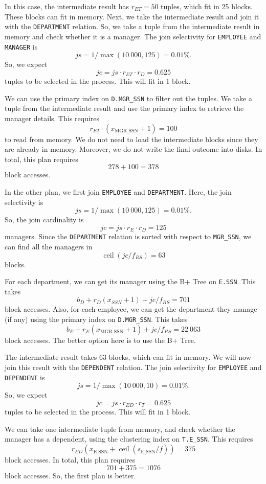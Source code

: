 \documentclass[a4paper, openany]{memoir}
\theoremstyle{definition}
\theoremstyle{plain}
\begin{document}
In this case, the intermediate result has $r_{ET} = 50$ tuples, which fit in 25 blocks. These blocks can fit in memory. Next, we take the intermediate result and join it with the \texttt{DEPARTMENT} relation. So, we take a tuple from the intermediate result in memory and check whether it is a manager. The join selectivity for \texttt{EMPLOYEE} and \texttt{MANAGER} is
\[\textit{js} = 1/\max(10\ 000, 125) = 0.01\%.\]
So, we expect
\[\textit{jc} = \textit{js} \cdot r_{ET} \cdot r_D = 0.625\]
tuples to be selected in the process. This will fit in 1 block. 

We can use the primary index on \texttt{D.MGR\_SSN} to filter out the tuples. We take a tuple from the intermediate result and use the primary index to retrieve the manager details. This requires
\[r_{ET} \cdot (x_{\text{MGR\_SSN}} + 1) = 100\]
to read from memory. We do not need to load the intermediate blocks since they are already in memory. Moreover, we do not write the final outcome into disks. In total, this plan requires
\[278 + 100 = 378\]
block accesses.

In the other plan, we first join \texttt{EMPLOYEE} and \texttt{DEPARTMENT}. Here, the join selectivity is
\[\textit{js} = 1/\max(10 \ 000, 125) = 0.01\%.\]
So, the join cardinality is
\[\textit{jc} = \textit{js} \cdot r_E \cdot r_D = 125\]
managers. Since the \texttt{DEPARTMENT} relation is sorted with respect to \texttt{MGR\_SSN}, we can find all the managers in
\[\operatorname{ceil}(\textit{jc}/f_{RS}) = 63\]
blocks.

For each department, we can get its manager using the B+ Tree on \texttt{E.SSN}. This takes
\[b_D + r_D(x_{SSN} + 1) + \textit{jc}/f_{RS} = 701\]
block accesses. Also, for each employee, we can get the department they manage (if any) using the primary index on \texttt{D.MGR\_SSN}. This takes
\[b_E + r_E(x_{\text{MGR\_SSN}} + 1) + \textit{jc}/f_{RS} = 22 \ 063\]
block accesses. The better option here is to use the B+ Tree. 

The intermediate result takes 63 blocks, which can fit in memory. We will now join this result with the \texttt{DEPENDENT} relation. The join selectivity for \texttt{EMPLOYEE} and \texttt{DEPENDENT} is
\[\textit{js} = 1/\max(10 \ 000, 10) = 0.01\%.\]
So, we expect
\[\textit{jc} = \textit{js} \cdot r_{ED} \cdot r_T = 0.625\]
tuples to be selected in the process. This will fit in 1 block.

We can take one intermediate tuple from memory, and check whether the manager has a dependent, using the clustering index on \texttt{T.E\_SSN}. This requires
\[r_{ED} (x_{\text{E\_SSN}} + \operatorname{ceil}(s_{\text{E\_SSN}}/f)) = 375\]
block accesses. In total, this plan requires
\[701 + 375 = 1076\]
block accesses. So, the first plan is better.
\end{document}
